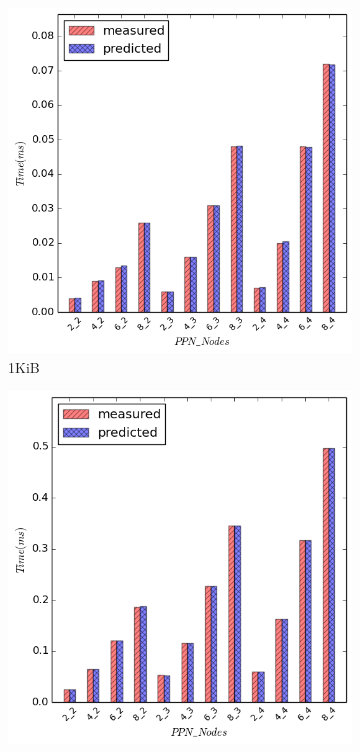 \begin{figure}[H]
    \centering
    \captionsetup{justification=centering,margin=0cm,font=footnotesize}
    \begin{subfigure}[b]{0.4\textwidth}
        \includegraphics[width=\textwidth]{./images/scatter_NUMA/scatter_1024}
        \caption{1KiB}
    \end{subfigure}
    \quad 
        \begin{subfigure}[b]{0.4\textwidth}
        \includegraphics[width=\textwidth]{./images/scatter_NUMA/scatter_16384}

\end{subfigure}
\end{figure}

